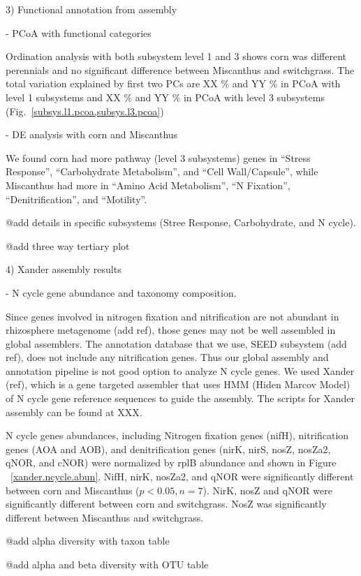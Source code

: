 \documentclass[12pt]{article}
\begin{document}
3) Functional annotation from assembly

- PCoA with functional categories

Ordination analysis with both subsystem level 1 and 3 shows corn was different perennials and no significant difference between Miscanthus and switchgrass. The total variation explained by first two PCs are XX \% and YY \% in PCoA with level 1 subsystems and XX \% and YY \% in PCoA with level 3 subsystems (Fig.~\ref{subsys.l1.pcoa,subsys.l3.pcoa})

- DE analysis with corn and Miscanthus

We found corn had more pathway (level 3 subsystems) genes in ``Stress Response'', ``Carbohydrate Metabolism'', and ``Cell Wall/Capsule'', while Miscanthus had more in ``Amino Acid Metabolism'', ``N Fixation'', ``Denitrification'', and ``Motility''.

  @add details in specific subsystems (Stree Response, Carbohydrate, and N cycle).

  @add three way tertiary plot

4) Xander assembly results

- N cycle gene abundance and taxonomy composition.

Since genes involved in nitrogen fixation and nitrification are not abundant in rhizosphere metagenome (add ref), those genes may not be well assembled in global assemblers. The annotation database that we use, SEED subsystem (add ref), does not include any nitrification genes. Thus our global assembly and annotation pipeline is not good option to analyze N cycle genes. We used Xander (ref), which is a gene targeted assembler that uses HMM (Hiden Marcov Model) of N cycle gene reference sequences to guide the assembly. The scripts for Xander assembly can be found at XXX.

N cycle genes abundances, including Nitrogen fixation genes (nifH), nitrification genes (AOA and AOB), and denitrification genes (nirK, nirS, nosZ, nosZa2, qNOR, and cNOR) were normalized by rplB abundance and shown in Figure ~\ref{xander.ncycle.abun}. NifH, nirK, nosZa2, and qNOR were significantly different between corn and Miscanthus ($p < 0.05, n = 7$). NirK, nosZ and qNOR  were significantly different between corn and switchgrass. NosZ was significantly different between Miscanthus and switchgrass.

@add alpha diversity with taxon table

@add alpha and beta diversity with OTU table
\end{document}
